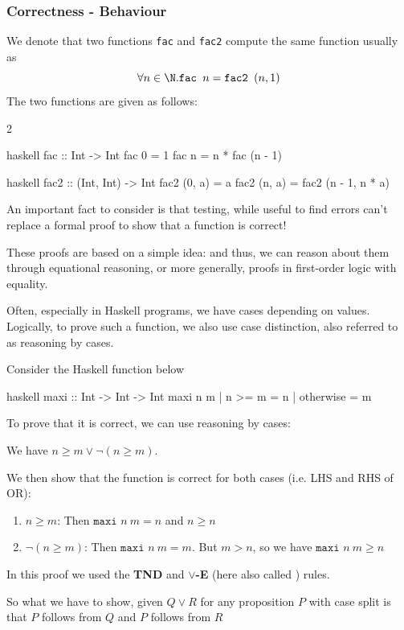 \subsubsection{Correctness - Behaviour}
We denote that two functions \texttt{fac} and \texttt{fac2} compute the same function usually as
\[
    \forall n \in \N. \texttt{fac } n = \texttt{fac2 } (n, 1)
\]
The two functions are given as follows:
\begin{multicols}{2}
    \begin{code}{haskell}
        fac :: Int -> Int
        fac 0 = 1
        fac n = n * fac (n - 1)
    \end{code}
    \begin{code}{haskell}
        fac2 :: (Int, Int) -> Int
        fac2 (0, a) = a
        fac2 (n, a) = fac2 (n - 1, n * a)
    \end{code}
\end{multicols}
An important fact to consider is that testing, while useful to find errors can't replace a formal proof to show that a function is correct!

These proofs are based on a simple idea:  and thus, we can reason about them through equational reasoning, or more generally,
proofs in first-order logic with equality.

Often, especially in Haskell programs, we have cases depending on values. Logically, to prove such a function, we also use case distinction, also referred to as reasoning by cases.

\inlineexample Consider the Haskell function below \rmvspace
\begin{code}{haskell}
    maxi :: Int -> Int -> Int
    maxi n m
        | n >= m    = n
        | otherwise = m
\end{code}
To prove that it is correct, we can use reasoning by cases:

We have $n \geq m \lor \neg(n \geq m)$.

We then show that the function is correct for both cases (i.e. LHS and RHS of OR):
\begin{enumerate}[label=C\arabic*]
    \item $n \geq m$: Then $\texttt{maxi } n \ m = n$ and $n \geq n$
    \item $\neg(n \geq m)$: Then $\texttt{maxi } n \ m = m$. But $m > n$, so we have $\texttt{maxi } n\ m \geq n$
\end{enumerate}
In this proof we used the \textbf{TND} and \textbf{$\lor$-E} (here also called ) rules.

So what we have to show, given $Q \lor R$ for any proposition $P$ with case split is that  $P$ follows from $Q$ and  $P$ follows from $R$
